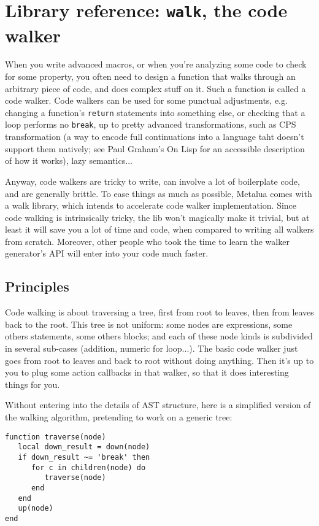 \section{Library reference: {\tt walk}, the code walker}

When you write advanced macros, or when you're analyzing some code to check for
some property, you often need to design a function that walks through an
arbitrary piece of code, and does complex stuff on it. Such a function is called
a code walker. Code walkers can be used for some punctual adjustments, e.g.
changing a function's {\tt return} statements into something else, or checking
that a loop performs no {\tt break}, up to pretty advanced transformations, such
as CPS transformation (a way to encode full continuations into a language taht
doesn't support them natively; see Paul Graham's On Lisp for an accessible
description of how it works), lazy semantics...

Anyway, code walkers are tricky to write, can involve a lot of boilerplate code,
and are generally brittle. To ease things as much as possible, Metalua comes
with a walk library, which intends to accelerate code walker implementation.
Since code walking is intrinsically tricky, the lib won't magically make it
trivial, but at least it will save you a lot of time and code, when compared to
writing all walkers from scratch. Moreover, other people who took the time to
learn the walker generator's API will enter into your code much faster.

\subsection{Principles}

Code walking is about traversing a tree, first from root to leaves, then from
leaves back to the root. This tree is not uniform: some nodes are expressions,
some others statements, some others blocks; and each of these node kinds is
subdivided in several sub-cases (addition, numeric for loop...). The basic code
walker just goes from root to leaves and back to root without doing anything.
Then it's up to you to plug some action callbacks in that walker, so that it
does interesting things for you.

Without entering into the details of AST structure, here is a simplified version
of the walking algorithm, pretending to work on a generic tree:

\begin{verbatim}
function traverse(node)
   local down_result = down(node)
   if down_result ~= 'break' then 
      for c in children(node) do
         traverse(node)
      end
   end
   up(node)
end
\end{verbatim}

